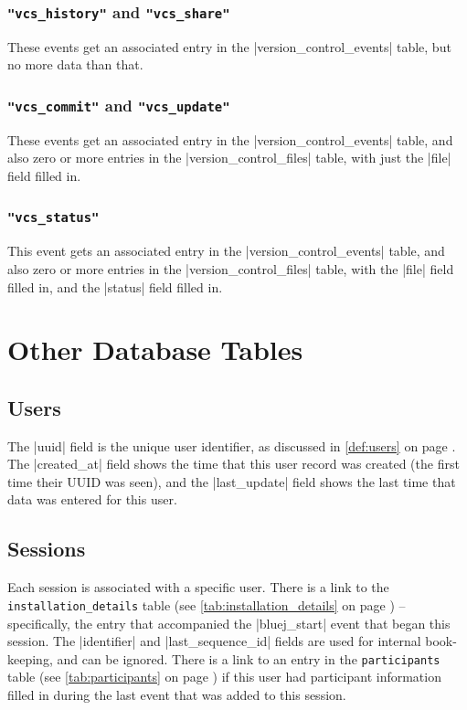 \documentclass{report}
\newcommand{\myref}[1]{\autoref{#1} on page \pageref*{#1}}
\newcommand{\tabref}[1]{\lstinline|#1| table (see \myref{tab:#1})}
\begin{document}
\subsection{\lstinline!"vcs_history"! and \lstinline!"vcs_share"!}

These events get an associated entry in the |version_control_events|
table, but no more data than that.

\subsection{\lstinline!"vcs_commit"! and \lstinline!"vcs_update"!}

These events get an associated entry in the |version_control_events|
table, and also zero or more entries in the |version_control_files|
table, with just the |file| field filled in.

\subsection{\lstinline!"vcs_status"!}

This event gets an associated entry in the |version_control_events|
table, and also zero or more entries in the |version_control_files|
table, with the |file| field filled in, and the |status| field filled
in.

\chapter{Other Database Tables}

\section{Users}


The |uuid| field is the unique user identifier, as discussed in \myref{def:users}.
The |created_at| field shows the time that this user record was
created (the first time their UUID was seen), and the |last_update| field shows the last time that data was entered for
this user.

\section{Sessions}


Each session is associated with a specific user.  There is a link to
the \tabref{installation_details} -- specifically, the entry that
accompanied the |bluej_start| event that began this session.  The
|identifier| and |last_sequence_id| fields are used for internal
book-keeping, and can be ignored.  There is a link to an entry in the
\tabref{participants} if this user had participant information filled in
during the last event that was added to this session.
\end{document}
